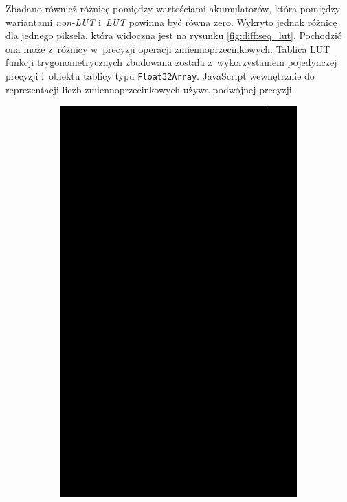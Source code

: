 Zbadano również różnicę pomiędzy wartościami akumulatorów, która pomiędzy wariantami \textit{non-LUT} i~\textit{LUT} powinna być równa zero. Wykryto jednak różnicę dla jednego piksela, która widoczna jest na rysunku \ref{fig:diff:seq_lut}. Pochodzić ona może z~różnicy w~precyzji operacji zmiennoprzecinkowych. Tablica LUT funkcji trygonometrycznych zbudowana została z~wykorzystaniem pojedynczej precyzji i~obiektu tablicy typu \lstinline{Float32Array}. JavaScript wewnętrznie do reprezentacji liczb zmiennoprzecinkowych używa podwójnej precyzji.


\begin{figure}[h]
    \begin{subfigure}{0.3\textwidth}
        \includegraphics[width=\linewidth] {../../packages/js-benchmarks/img/diff_seq_seq_lookup.png}

\end{subfigure}
\end{figure}
